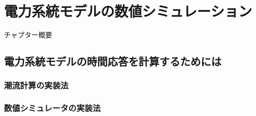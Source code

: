 \documentclass[tombow,dvipdfmx]{corona-a5-1.1}
\begin{document}
\chapter{電力系統モデルの数値シミュレーション}\label{chap:numcal}

チャプター概要

\section{電力系統モデルの時間応答を計算するためには}\label{sec:howtocal}
\subsection{潮流計算の実装法}
%
\subsection{数値シミュレータの実装法}

\end{document}
